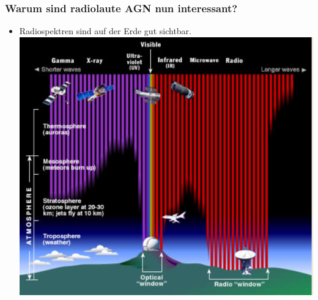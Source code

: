 \documentclass[aspectratio=1610, 9pt]{beamer}
\begin{document}
\begin{frame}\frametitle{Warum sind radiolaute AGN nun interessant?}
  \begin{itemize}
    \item Radiospektren sind auf der Erde gut sichtbar.
    \includegraphics{images/durchlaessigkeit.png}
  \end{itemize}
\end{frame}
\end{document}
